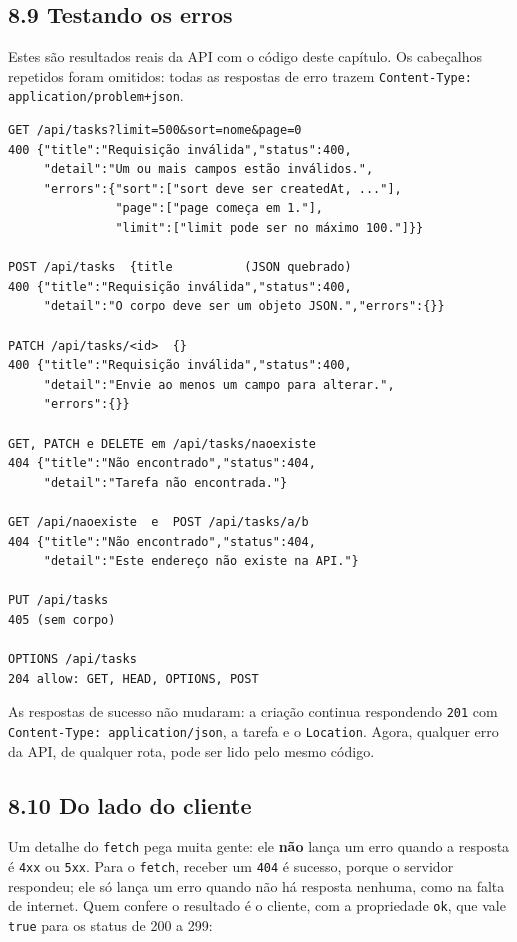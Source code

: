 \subsection{8.9 Testando os erros}

Estes são resultados reais da API com o código deste capítulo. Os cabeçalhos repetidos foram omitidos: todas as respostas de erro trazem \texttt{Content-Type: application/problem+json}.

\begin{codigo}
\begin{Verbatim}[breaklines=true, breaksymbolleft={}, fontsize=\footnotesize]
GET /api/tasks?limit=500&sort=nome&page=0
400 {"title":"Requisição inválida","status":400,
     "detail":"Um ou mais campos estão inválidos.",
     "errors":{"sort":["sort deve ser createdAt, ..."],
               "page":["page começa em 1."],
               "limit":["limit pode ser no máximo 100."]}}

POST /api/tasks  {title          (JSON quebrado)
400 {"title":"Requisição inválida","status":400,
     "detail":"O corpo deve ser um objeto JSON.","errors":{}}

PATCH /api/tasks/<id>  {}
400 {"title":"Requisição inválida","status":400,
     "detail":"Envie ao menos um campo para alterar.",
     "errors":{}}

GET, PATCH e DELETE em /api/tasks/naoexiste
404 {"title":"Não encontrado","status":404,
     "detail":"Tarefa não encontrada."}

GET /api/naoexiste  e  POST /api/tasks/a/b
404 {"title":"Não encontrado","status":404,
     "detail":"Este endereço não existe na API."}

PUT /api/tasks
405 (sem corpo)

OPTIONS /api/tasks
204 allow: GET, HEAD, OPTIONS, POST
\end{Verbatim}
\end{codigo}

As respostas de sucesso não mudaram: a criação continua respondendo \texttt{201} com \texttt{Content-Type: application/json}, a tarefa e o \texttt{Location}. Agora, qualquer erro da API, de qualquer rota, pode ser lido pelo mesmo código.

\subsection{8.10 Do lado do cliente}

Um detalhe do \texttt{fetch} pega muita gente: ele \textbf{não} lança um erro quando a resposta é \texttt{4xx} ou \texttt{5xx}. Para o \texttt{fetch}, receber um \texttt{404} é sucesso, porque o servidor respondeu; ele só lança um erro quando não há resposta nenhuma, como na falta de internet. Quem confere o resultado é o cliente, com a propriedade \texttt{ok}, que vale \texttt{true} para os status de 200 a 299:

